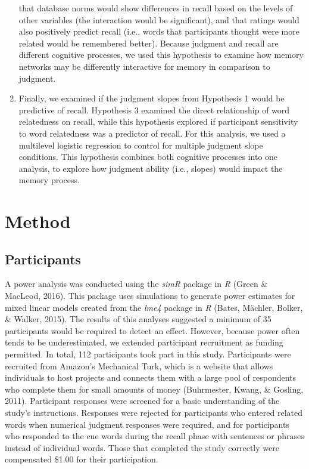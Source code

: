 \documentclass[english,man]{apa6}
\theoremstyle{definition}
\theoremstyle{definition}
\theoremstyle{definition}
\theoremstyle{remark}
\begin{document}
\begin{enumerate}
  that database norms would show differences in recall based on the
  levels of other variables (the interaction would be significant), and
  that ratings would also positively predict recall (i.e., words that
  participants thought were more related would be remembered better).
  Because judgment and recall are different cognitive processes, we used
  this hypothesis to examine how memory networks may be differently
  interactive for memory in comparison to judgment.
\item
  Finally, we examined if the judgment slopes from Hypothesis 1 would be
  predictive of recall. Hypothesis 3 examined the direct relationship of
  word relatedness on recall, while this hypothesis explored if
  participant sensitivity to word relatedness was a predictor of recall.
  For this analysis, we used a multilevel logistic regression to control
  for multiple judgment slope conditions. This hypothesis combines both
  cognitive processes into one analysis, to explore how judgment ability
  (i.e., slopes) would impact the memory process.
\end{enumerate}

\section{Method}\label{method}

\subsection{Participants}\label{participants}

A power analysis was conducted using the \emph{simR} package in \emph{R}
(Green \& MacLeod, 2016). This package uses simulations to generate
power estimates for mixed linear models created from the \emph{lme4}
package in \emph{R} (Bates, Mächler, Bolker, \& Walker, 2015). The
results of this analyses suggested a minimum of 35 participants would be
required to detect an effect. However, because power often tends to be
underestimated, we extended participant recruitment as funding
permitted. In total, 112 participants took part in this study.
Participants were recruited from Amazon's Mechanical Turk, which is a
website that allows individuals to host projects and connects them with
a large pool of respondents who complete them for small amounts of money
(Buhrmester, Kwang, \& Gosling, 2011). Participant responses were
screened for a basic understanding of the study's instructions.
Responses were rejected for participants who entered related words when
numerical judgment responses were required, and for participants who
responded to the cue words during the recall phase with sentences or
phrases instead of individual words. Those that completed the study
correctly were compensated \$1.00 for their participation.
\end{document}
